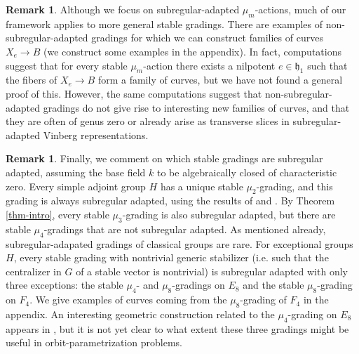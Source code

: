 \documentclass{article} %
\numberwithin{equation}{section}
\theoremstyle{definition}
\newtheorem{remark}[proposition]{Remark}
\newcommand{\frakh}{\mathfrak h}
\begin{document}
\begin{remark}
   Although we focus on subregular-adapted $\mu_m$-actions,
    much of our framework applies to more general stable gradings. There are examples of non-subregular-adapted gradings for which we can construct families of curves $X_e\rightarrow B$ (we construct some examples in the appendix). In fact, computations suggest that for every stable $\mu_m$-action there exists a nilpotent $e \in \frakh_1$ such that the fibers of $X_e \rightarrow B$ form a family of curves, but we have not found a general proof of this.
    However, the same computations suggest that non-subregular-adapted gradings do not give rise to interesting new families of curves, and that they are often of genus zero or already arise as transverse slices in subregular-adapted Vinberg representations. 
\end{remark}

\begin{remark}
Finally, we comment on which stable gradings are subregular adapted, assuming the base field $k$ to be algebraically closed of characteristic zero. Every simple adjoint group $H$ has a unique stable $\mu_2$-grading, and this grading is always subregular adapted, using the results of \cite{Thorne-thesis} and \cite{KostantRallis-Orbitsrepresentationssymmetrisspaces}. 
By Theorem \ref{thm-intro}, every stable $\mu_3$-grading is also subregular adapted, but there are stable $\mu_4$-gradings that are not subregular adapted. As mentioned already, subregular-adapated gradings of classical groups are rare. For exceptional groups $H$, every stable grading with nontrivial generic stabilizer (i.e. such that the centralizer in $G$ of a stable vector is nontrivial) is subregular adapted with only three exceptions: the stable $\mu_4$- and $\mu_8$-gradings on $E_8$ and the stable $\mu_8$-grading on $F_4$. We give examples of curves coming from the $\mu_8$-grading of $F_4$ in the appendix. 
An interesting geometric construction related to the $\mu_4$-grading on $E_8$ appears in \cite[Section 9]{Gruson-Sam-Weyman}, but it is not yet clear to what extent these three gradings might be useful in orbit-parametrization problems. 
\end{remark}
\end{document}
